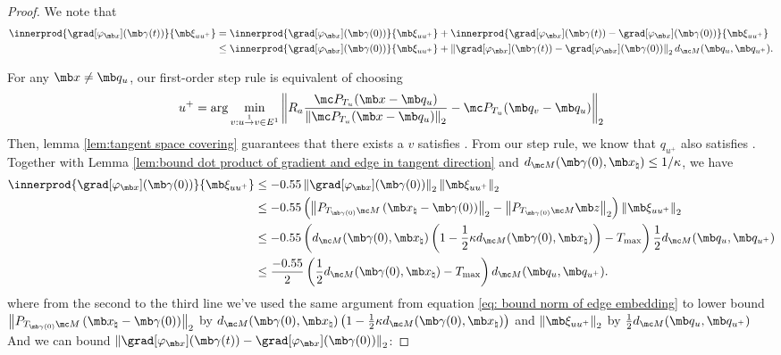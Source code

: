 \begin{proof}
    We note that
    \begin{equation}
    \begin{aligned}
        \innerprod{\grad[\varphi_{\mb x}](\mb\gamma(t))}{\mb \xi_{uu^+}}
        &= \innerprod{\grad[\varphi_{\mb x}](\mb\gamma(0))}{\mb \xi_{uu^+}} 
        + \innerprod{\grad[\varphi_{\mb x}](\mb\gamma(t)) - \grad[\varphi_{\mb x}](\mb\gamma(0))}{\mb \xi_{uu^+}}\\
        &\leq \innerprod{\grad[\varphi_{\mb x}](\mb\gamma(0))}{\mb \xi_{uu^+}} 
        + \left\| \grad[\varphi_{\mb x}](\mb\gamma(t)) - \grad[\varphi_{\mb x}](\mb\gamma(0)) \right\|_2 d_{\mc M}(\mb q_u, \mb q_{u^+}).
    \end{aligned}
\end{equation}


For any $\mb x \ne \mb q_u$, our first-order step rule is equivalent of choosing \[u^+ = \arg \min_{v : u \overset{1}{\rightarrow} v \in E^1} \left\| R_a\frac{\mc P_{T_u} (\mb x -\mb q_u)}{\left\|\mc P_{T_u} (\mb x -\mb q_u) \right\|_2} - \mc P_{T_u} (\mb q_v - \mb q_u) \right\|_2\] 
Then, lemma \ref{lem:tangent space covering} guarantees that there exists a $v$ satisfies . From our step rule, we know that $q_{u^+}$ also satisfies . Together with Lemma \ref{lem:bound dot product of gradient and edge in tangent direction}  and $d_{\mc M}(\mb\gamma(0),\mb x_\natural) \leq 1/\kappa$, we have
\begin{equation}
    \begin{aligned}
        \innerprod{\grad[\varphi_{\mb x}](\mb\gamma(0))}{\mb \xi_{uu^+}} 
        &\leq -0.55 \left\|\grad[\varphi_{\mb x}](\mb\gamma(0)) \right\|_2 \left\|\mb \xi_{uu^+} \right\|_2\\
        &\leq -0.55 \left( \left\| P_{T_{\mb\gamma(0)}\mc M}  \left(\mb x_\natural - \mb\gamma(0)\right)\right\|_2 - \left\| P_{T_{\mb\gamma(0)}\mc M} \mb z\right\|_2\right) \left\|\mb \xi_{uu^+} \right\|_2\\
        &\leq -0.55\left( d_{\mc M}(\mb\gamma(0),\mb x_\natural)\left( 1-\frac{1}{2}\kappa d_{\mc M}(\mb\gamma(0),\mb x_\natural)\right) - T_{\max}\right) \frac{1}{2}d_{\mc M}(\mb q_u, \mb q_{u^+})\\
        &\leq \frac{-0.55}{2}\left(\frac{1}{2}d_{\mc M}(\mb\gamma(0),\mb x_\natural) -T_{\max} \right) d_{\mc M}(\mb q_u, \mb q_{u^+}).
    \end{aligned}
\end{equation}
where from the second to the third line we've used the same argument from equation \eqref{eq: bound norm of edge embedding} to lower bound $\left\| P_{T_{\mb\gamma(0)}\mc M}  \left(\mb x_\natural - \mb\gamma(0)\right)\right\|_2$ by $d_{\mc M}(\mb\gamma(0),\mb x_\natural)\left( 1-\frac{1}{2}\kappa d_{\mc M}(\mb\gamma(0),\mb x_\natural)\right)$ and $\left\|\mb \xi_{uu^+} \right\|_2$ by $\frac{1}{2}d_{\mc M}(\mb q_u, \mb q_{u^+})$
And we can bound $\left\| \grad[\varphi_{\mb x}](\mb\gamma(t)) - \grad[\varphi_{\mb x}](\mb\gamma(0)) \right\|_2$:


\end{proof}
